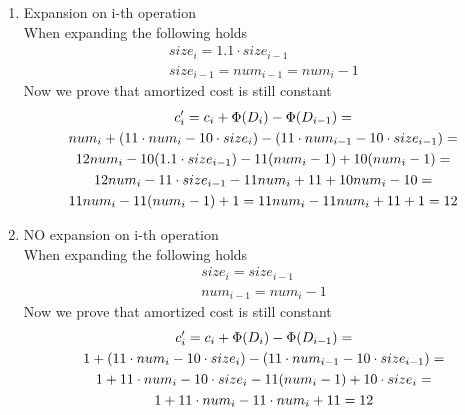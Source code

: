 \documentclass[12pt]{article}
\begin{document}
	\begin{enumerate}[label=\alph*)]
		\item Expansion on i-th operation\\
		When expanding the following holds
		\begin{gather*}
			size_i = 1.1 \cdot size_{i-1}\\
			size_{i-1} = num_{i-1} = num_i - 1
		\end{gather*}
		Now we prove that amortized cost is still constant
		\begin{gather*}
			c_i\sp{\prime} = c_i + \Phi(D_i) - \Phi(D_{i-1}) =\\
			num_i + (11 \cdot num_i - 10 \cdot size_i) - (11 \cdot num_{i-1} - 10 \cdot size_{i-1}) =\\
			12num_i - 10(1.1 \cdot size_{i-1}) - 11(num_i - 1) + 10(num_i - 1) =\\
			12num_i - 11 \cdot size_{i-1} - 11num_i + 11 + 10num_i - 10 =\\
			11num_i - 11(num_i - 1) + 1 = 11num_i - 11num_i + 11 + 1 = 12
		\end{gather*}
		
		\item NO expansion on i-th operation\\
		When expanding the following holds
		\begin{gather*}
		size_i = size_{i-1}\\
		num_{i-1} = num_i - 1
		\end{gather*}
		Now we prove that amortized cost is still constant
		\begin{gather*}
		c_i\sp{\prime} = c_i + \Phi(D_i) - \Phi(D_{i-1}) =\\
		1 + (11 \cdot num_i - 10 \cdot size_i) - (11 \cdot num_{i-1} - 10 \cdot size_{i-1}) =\\
		1 + 11 \cdot num_i - 10 \cdot size_i - 11(num_i - 1) + 10 \cdot size_i =\\
		1 + 11 \cdot num_i - 11 \cdot num_i + 11 = 12
		\end{gather*}
	\end{enumerate}
\end{document}
